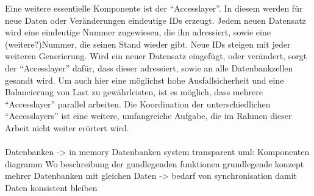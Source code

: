 \documentclass[a4paper,11pt,oneside,%
headsepline,												%
footsepline,												%
bibtotocnumbered									%
]{scrreprt}
\begin{document}
Eine weitere essentielle Komponente ist der \enquote{Accesslayer}. In diesem werden für neue Daten oder Veränderungen eindeutige \ac{ID}s erzeugt. Jedem neuen Datensatz wird eine eindeutige Nummer zugewiesen, die ihn adressiert, sowie eine (weitere?)Nummer, die seinen Stand wieder gibt. Neue \ac{ID}s steigen mit jeder weiteren Generierung. Wird ein neuer Datensatz eingefügt, oder verändert, sorgt der \enquote{Accesslayer} dafür, dass dieser adressiert, sowie an alle Datenbankzellen gesandt wird. Um auch hier eine möglichst hohe Ausfallsicherheit und eine Balancierung von Last zu gewährleisten, ist es möglich, dass mehrere \enquote{Accesslayer} parallel arbeiten. Die Koordination der unterschiedlichen \enquote{Accesslayers} ist eine weitere, umfangreiche Aufgabe, die im Rahmen dieser Arbeit nicht weiter erörtert wird.\\\\
 Datenbanken -> in memory
Datenbanken system transparent
uml: Komponenten diagramm
Wo beschreibung der gundlegenden funktionen
grundlegende konzept mehrer Datenbanken mit gleichen Daten -> bedarf von synchronisation damit Daten konsistent bleiben
\end{document}
